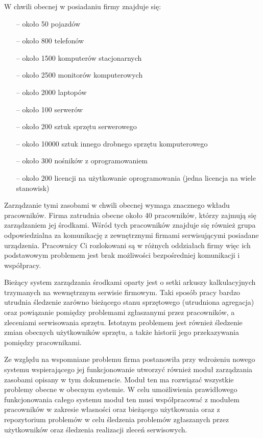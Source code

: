 W chwili obecnej w posiadaniu firmy znajduje się:

\begin{itemize}
\item[--] około 50 pojazdów
\item[--] około 800 telefonów
\item[--] około 1500 komputerów stacjonarnych
\item[--] około 2500 monitorów komputerowych
\item[--] około 2000 laptopów
\item[--] około 100 serwerów
\item[--] około 200 sztuk sprzętu serwerowego
\item[--] około 10000 sztuk innego drobnego sprzętu komputerowego
\item[--] około 300 nośników z oprogramowaniem
\item[--] około 200 licencji na użytkowanie oprogramowania (jedna licencja na wiele stanowisk)
\end{itemize}

Zarządzanie tymi zasobami w chwili obecnej wymaga znacznego wkładu
pracowników. Firma zatrudnia obecne około 40 pracowników, którzy
zajmują się zarządzaniem jej środkami. Wśród tych pracowników znajduje
się również grupa odpowiedzialna za komunikację z zewnętrznymi firmami
serwisującymi posiadane urządzenia. Pracownicy Ci rozlokowani są w
różnych oddziałach firmy więc ich podstawowym problemem jest brak
możliwości bezpośredniej komunikacji i współpracy.

Bieżący system zarządzania środkami oparty jest o setki arkuszy
kalkulacyjnych trzymanych na wewnętrznym serwisie firmowym. Taki
sposób pracy bardzo utrudnia śledzenie zarówno bieżącego stanu
sprzętowego (utrudniona agregacja) oraz powiązanie pomiędzy problemami
zgłaszanymi przez pracowników, a zleceniami serwisowania
sprzętu. Istotnym problemem jest również śledzenie zmian obecnych
użytkowników sprzętu, a także historii jego przekazywania pomiędzy
pracownikami.

Ze względu na wspomniane problemu firma postanowiła przy wdrożeniu
nowego systemu wspierającego jej funkcjonowanie utworzyć również moduł
zarządzania zasobami opisany w tym dokumencie. Moduł ten ma rozwiązać
wszystkie problemy obecne w obecnym systemie. W celu umożliwienia
prawidłowego funkcjonowania całego systemu moduł ten musi
współpracować z modułem pracowników w zakresie własności oraz
bieżącego użytkowania oraz z repozytorium problemów w celu śledzenia
problemów zgłaszanych przez użytkowników oraz śledzenia realizacji
zleceń serwisowych.

